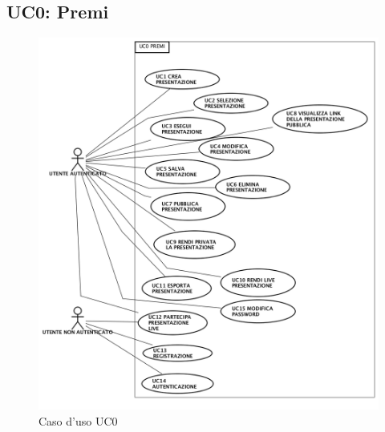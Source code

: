 \subsection{ UC0: Premi}
\begin{figure}[h]
	\begin{center}
	\includegraphics[scale=0.4]{diagram/UC0.png}
	\caption{Caso d'uso UC0}
	\end{center}
\end{figure}
